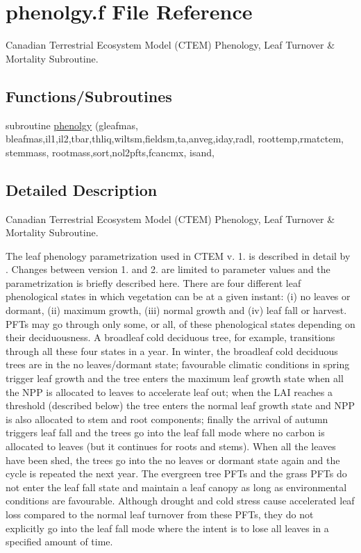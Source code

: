 \hypertarget{phenolgy_8f}{}\section{phenolgy.\+f File Reference}
\label{phenolgy_8f}


Canadian Terrestrial Ecosystem Model (C\+T\+E\+M) Phenology, Leaf Turnover \& Mortality Subroutine.  


\subsection*{Functions/\+Subroutines}
\begin{DoxyCompactItemize}
\item 
subroutine \hyperlink{phenolgy_8f_a4f89c3f25a6a441c8ec681238b5b3f4d}{phenolgy} (gleafmas, bleafmas,il1,il2,tbar,thliq,wiltsm,fieldsm,ta,anveg,iday,radl, roottemp,rmatctem, stemmass, rootmass,sort,nol2pfts,fcancmx, isand,
\end{DoxyCompactItemize}


\subsection{Detailed Description}
Canadian Terrestrial Ecosystem Model (C\+T\+E\+M) Phenology, Leaf Turnover \& Mortality Subroutine. 

The leaf phenology parametrization used in C\+T\+E\+M v. 1. is described in detail by \cite{Arora2005-6b1}. Changes between version 1. and 2. are limited to parameter values and the parametrization is briefly described here. There are four different leaf phenological states in which vegetation can be at a given instant\+: (i) no leaves or dormant, (ii) maximum growth, (iii) normal growth and (iv) leaf fall or harvest. P\+F\+Ts may go through only some, or all, of these phenological states depending on their deciduousness. A broadleaf cold deciduous tree, for example, transitions through all these four states in a year. In winter, the broadleaf cold deciduous trees are in the no leaves/dormant state; favourable climatic conditions in spring trigger leaf growth and the tree enters the maximum leaf growth state when all the N\+P\+P is allocated to leaves to accelerate leaf out; when the L\+A\+I reaches a threshold (described below) the tree enters the normal leaf growth state and N\+P\+P is also allocated to stem and root components; finally the arrival of autumn triggers leaf fall and the trees go into the leaf fall mode where no carbon is allocated to leaves (but it continues for roots and stems). When all the leaves have been shed, the trees go into the no leaves or dormant state again and the cycle is repeated the next year. The evergreen tree P\+F\+Ts and the grass P\+F\+Ts do not enter the leaf fall state and maintain a leaf canopy as long as environmental conditions are favourable. Although drought and cold stress cause accelerated leaf loss compared to the normal leaf turnover from these P\+F\+Ts, they do not explicitly go into the leaf fall mode where the intent is to lose all leaves in a specified amount of time.

